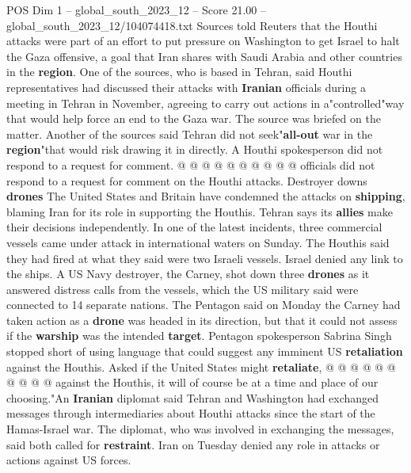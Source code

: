 \begin{textsample}{POS Dim 1 – global\_south\_2023\_12 – Score 21.00 – global\_south\_2023\_12/104074418.txt}
Sources told Reuters that the Houthi attacks were part of an effort to put pressure on Washington to get Israel to halt the Gaza offensive, a goal that Iran shares with Saudi Arabia and other countries in the \textbf{region}.
One of the sources, who is based in Tehran, said Houthi representatives had discussed their attacks with \textbf{Iranian} officials during a meeting in Tehran in November, agreeing to carry out actions in a"controlled"way that would help force an end to the Gaza war.
The source was briefed on the matter.
Another of the sources said Tehran did not seek"\textbf{all-out} war in the \textbf{region}"that would risk drawing it in directly.
A Houthi spokesperson did not respond to a request for comment. @ @ @ @ @ @ @ @ @ @ officials did not respond to a request for comment on the Houthi attacks.
Destroyer downs \textbf{drones} The United States and Britain have condemned the attacks on \textbf{shipping}, blaming Iran for its role in supporting the Houthis.
Tehran says its \textbf{allies} make their decisions independently.
In one of the latest incidents, three commercial vessels came under attack in international waters on Sunday.
The Houthis said they had fired at what they said were two Israeli vessels.
Israel denied any link to the ships.
A US Navy destroyer, the Carney, shot down three \textbf{drones} as it answered distress calls from the vessels, which the US military said were connected to 14 separate nations.
The Pentagon said on Monday the Carney had taken action as a \textbf{drone} was headed in its direction, but that it could not assess if the \textbf{warship} was the intended \textbf{target}.
Pentagon spokesperson Sabrina Singh stopped short of using language that could suggest any imminent US \textbf{retaliation} against the Houthis.
Asked if the United States might \textbf{retaliate}, @ @ @ @ @ @ @ @ @ @ against the Houthis, it will of course be at a time and place of our choosing."An \textbf{Iranian} diplomat said Tehran and Washington had exchanged messages through intermediaries about Houthi attacks since the start of the Hamas-Israel war.
The diplomat, who was involved in exchanging the messages, said both called for \textbf{restraint}.
Iran on Tuesday denied any role in attacks or actions against US forces.

\end{textsample}
